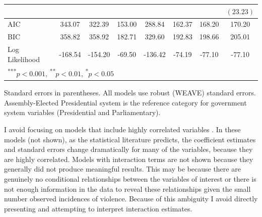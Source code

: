 \documentclass[a4paper]{article}\usepackage{graphicx, color}
\begin{document}
\begin{table}
\begin{center}
\begin{tabular}{l c c c c c c c }
                         &               &              &              &               &               &                    & $(23.23)$         \\
\hline
AIC                      & 343.07        & 322.39       & 153.00       & 288.84        & 162.37        & 168.20             & 170.20            \\
BIC                      & 358.82        & 358.92       & 182.71       & 329.60        & 192.83        & 198.66             & 205.01            \\
Log Likelihood           & -168.54       & -154.20      & -69.50       & -136.42       & -74.19        & -77.10             & -77.10            \\
\hline
\multicolumn{8}{l}{\scriptsize{\textsuperscript{***}$p<0.001$, 
  \textsuperscript{**}$p<0.01$, 
  \textsuperscript{*}$p<0.05$}}
\end{tabular}


\end{center}
{\scriptsize{
    Standard errors in parentheses. All models use robust (WEAVE) standard errors. \\
    Assembly-Elected Presidential system is the reference category for government system variables (Presidential and Parliamentary). \\
}}
\end{table}

I avoid focusing on models that include highly correlated variables \citep[see][]{Achen2002, Schrodt2006}. In these models (not shown), as the statistical literature predicts, the coefficient estimates and standard errors change dramatically for many of the variables, because they are highly correlated. Models with interaction terms are not shown because they generally did not produce meaningful results. This may be because there are genuinely no conditional relationships between the variables of interest or there is not enough information in the data to reveal these relationships given the small number observed incidences of violence. Because of this ambiguity I avoid directly presenting and attempting to interpret interaction estimates. 
\end{document}
